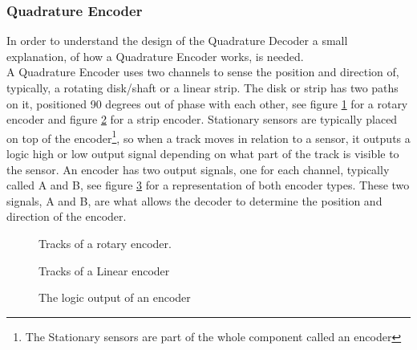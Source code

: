 \documentclass[../../../main]{subfiles}
\begin{document}
\label{subsec:Theory_encoder}
\subsubsection{Quadrature Encoder}
In order to understand the design of the Quadrature Decoder a small explanation, of how a Quadrature Encoder works, is needed. \\
A Quadrature Encoder uses two channels to sense the position and direction of, typically, a rotating disk/shaft or a linear strip. The disk or strip has two paths on it, positioned 90 degrees out of phase with each other, see figure \ref{rotary_encoder} for a rotary encoder and figure \ref{channels} for a strip encoder. Stationary sensors are typically placed on top of the encoder\footnote{The Stationary sensors are part of the whole component called an encoder}, so when a track moves in relation to a sensor, it outputs a logic high or low output signal depending on what part of the track is visible to the sensor. An encoder has two output signals, one for each channel, typically called A and B, see figure \ref{output_channels} for a representation of both encoder types. These two signals, A and B, are what allows the decoder to determine the position and direction of the encoder. \cite{encoder_princpel}

\begin{figure}[H]
  \centering
  \def\svgwidth{0.4\columnwidth}
  \fontsize{9}{9}\selectfont
  
  \caption{Tracks of a rotary encoder.}
  \label{rotary_encoder}
\end{figure}

\begin{figure}[H]
  \centering
  \def\svgwidth{0.7\columnwidth}
  \fontsize{9}{9}\selectfont
  
  \caption{Tracks of a Linear encoder}
  \label{channels}
\end{figure}

\begin{figure}[H]
  \centering
  \def\svgwidth{0.7\columnwidth}
  \fontsize{9}{9}\selectfont
  
  \caption{The logic output of an encoder}
  \label{output_channels}
\end{figure}
\end{document}
